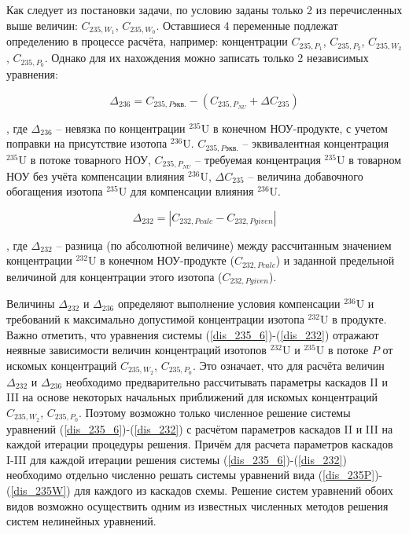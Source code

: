 Как следует из постановки задачи, по условию заданы только 2 из перечисленных выше величин: $C_{235,{W_1}}$, $C_{235,{W_0}}$. Оставшиеся 4 переменные подлежат определению в процессе расчёта, например: концентрации $C_{235,{P_1}}$, $C_{235,{P_2}}$, $C_{235,{W_2}}$, $C_{235,{P_0}}$. Однако для их нахождения можно записать только 2 независимых уравнения:  

\begin{equation}
    \label{dis_235_6}
    \Delta_{236}=C_{235,P\textit{экв.}}-(C_{235,{P_{NU}}}+\Delta C_{235})
\end{equation}

, где $\Delta_{236}$ -- невязка по концентрации $^{235}$U в конечном НОУ-продукте, с учетом поправки на присутствие изотопа $^{236}$U. $C_{235,P\textit{экв.}}$ -- эквивалентная концентрация $^{235}$U в потоке товарного НОУ, $C_{235,{P_{NU}}}$ -- требуемая концентрация $^{235}$U в товарном НОУ без учёта компенсации влияния $^{236}$U, $\Delta C_{235}$ -- величина добавочного обогащения изотопа $^{235}$U для компенсации влияния $^{236}$U. 

\begin{equation}
\label{dis_232}
\Delta_{232}=\left|C_{232,P\textit{calc}}-C_{232,P\textit{given}}\right|
\end{equation}

, где $\Delta_{232}$ -- разница (по абсолютной величине) между рассчитанным значением концентрации $^{232}$U в конечном НОУ-продукте ($C_{232,P\textit{calc}}$) и заданной предельной величиной для концентрации этого изотопа ($C_{232,P\textit{given}}$).

Величины $\Delta_{232}$ и $\Delta_{236}$ определяют выполнение условия компенсации $^{236}$U и требований к максимально допустимой концентрации изотопа $^{232}$U в продукте. Важно отметить, что уравнения системы (\ref{dis_235_6})-(\ref{dis_232}) отражают неявные зависимости величин концентраций изотопов $^{232}$U и $^{235}$U в потоке $P$ от искомых концентраций $C_{235,{W_2}}$, $C_{235,{P_0}}$. Это означает, что для расчёта величин $\Delta_{232}$ и $\Delta_{236}$ необходимо предварительно рассчитывать параметры каскадов II и III на основе некоторых начальных приближений для искомых концентраций $C_{235,{W_2}}$, $C_{235,{P_0}}$. Поэтому возможно только численное решение системы уравнений (\ref{dis_235_6})-(\ref{dis_232}) с расчётом параметров каскадов II и III на каждой итерации процедуры решения. Причём для расчета параметров каскадов I-III для каждой итерации решения системы (\ref{dis_235_6})-(\ref{dis_232}) необходимо отдельно численно решать системы уравнений вида (\ref{dis_235P})-(\ref{dis_235W}) для каждого из каскадов схемы. Решение систем уравнений обоих видов возможно осуществить одним из известных численных методов решения систем нелинейных уравнений. 

